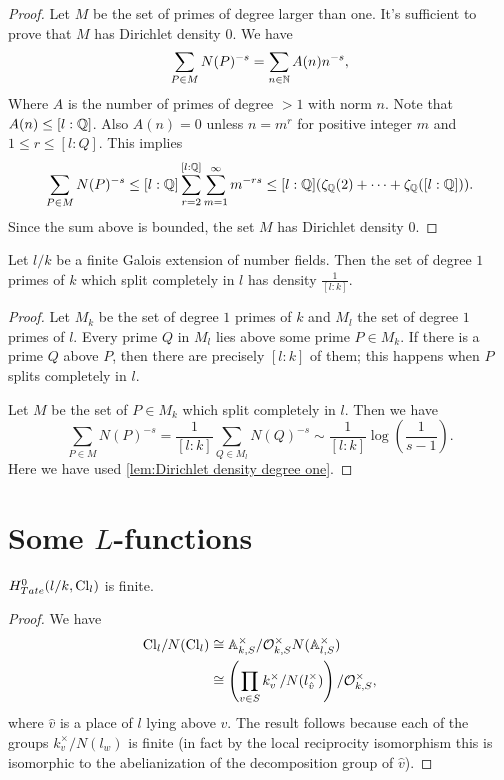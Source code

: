 \begin{proof}
	Let $M$ be the set of primes of degree larger than one. It's sufficient to
	prove that $M$ has Dirichlet density $0$.
	We have
	\[
		\sum_{P \in M} N(P)^{-s}
		= \sum_{n \in {\mathbb N}} A(n) n^{-s},
	\]
	Where $A$ is the number of primes of degree $>1$ with norm $n$.
	Note that $A(n) \le [l:{\mathbb Q}]$. Also $A(n)=0$ unless $n=m^r$ for positive integer $m$ and
	$1 \le r \le [l:Q]$.
	This implies
	\[
		\sum_{P \in M} N(P)^{-s}
		\le [l:{\mathbb Q}] \sum_{r=2}^{[l:{\mathbb Q}]} \sum_{m =1} ^\infty m^{-rs}
		\le [l:{\mathbb Q}] (\zeta_{\mathbb Q}(2) + \cdots + \zeta_{\mathbb Q}([l:{\mathbb Q}]) ).
	\]
	Since the sum above is bounded, the set $M$ has Dirichlet density $0$.
\end{proof}


\begin{lemma} \label{lem:Dirichlet density split}
	Let $l/k$ be a finite Galois extension of number fields.
	Then the set of degree $1$ primes of $k$ which split completely in $l$
	has density $\frac{1}{[l:k]}$.
\end{lemma}

\begin{proof}
	Let $M_k$ be the set of degree $1$ primes of $k$ and $M_l$ the set of degree $1$ primes of $l$.
	Every prime $Q$ in $M_l$ lies above some prime $P \in M_k$.
	If there is a prime $Q$ above $P$, then there are precisely $[l:k]$ of them; this happens when $P$
	splits completely in $l$.

	Let $M$ be the set of $P \in M_k$ which split completely in $l$.
	Then we have
	\[
		\sum_{P \in M} N(P)^{-s}
		=
		\frac{1}{[l:k]} \sum_{Q \in M_l} N(Q)^{-s}
		\sim \frac{1}{[l:k]} \log\left( \frac{1}{s-1}\right).
	\]
	Here we have used \ref{lem:Dirichlet density degree one}.
\end{proof}





\section{Some $L$-functions}

\begin{lemma}
	$H^0_{Tate}(l/k,\mathrm{Cl}_l)$ is finite.
\end{lemma}

\begin{proof}
	We have
	\begin{align*}
		\mathrm{Cl}_{l} / N(\mathrm{Cl}_l)
		& \cong {\mathbb A}_{k,S}^\times / {\mathcal O}_{k,S}^\times N({\mathbb A}_{l,S}^\times) \\
		& \cong \left(\prod_{v \in S} k_v^\times / N(l_{\hat v}^\times)\right) / {\mathcal O}_{k,S}^\times,
	\end{align*}
	where $\hat v$ is a place of $l$ lying above $v$.
	The result follows because each of the groups $k_v^\times / N(l_w)$ is finite
	(in fact by the local reciprocity isomorphism this is isomorphic to the abelianization of the
	decomposition group of $\hat v$).
\end{proof}

